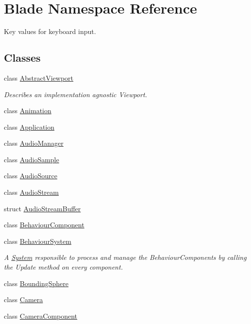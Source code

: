\hypertarget{namespace_blade}{}\section{Blade Namespace Reference}
\label{namespace_blade}


Key values for keyboard input.  


\subsection*{Classes}
\begin{DoxyCompactItemize}
\item 
class \hyperlink{class_blade_1_1_abstract_viewport}{Abstract\+Viewport}
\begin{DoxyCompactList}\small\item\em Describes an implementation agnostic Viewport. \end{DoxyCompactList}\item 
class \hyperlink{class_blade_1_1_animation}{Animation}
\item 
class \hyperlink{class_blade_1_1_application}{Application}
\item 
class \hyperlink{class_blade_1_1_audio_manager}{Audio\+Manager}
\item 
class \hyperlink{class_blade_1_1_audio_sample}{Audio\+Sample}
\item 
class \hyperlink{class_blade_1_1_audio_source}{Audio\+Source}
\item 
class \hyperlink{class_blade_1_1_audio_stream}{Audio\+Stream}
\item 
struct \hyperlink{struct_blade_1_1_audio_stream_buffer}{Audio\+Stream\+Buffer}
\item 
class \hyperlink{class_blade_1_1_behaviour_component}{Behaviour\+Component}
\item 
class \hyperlink{class_blade_1_1_behaviour_system}{Behaviour\+System}
\begin{DoxyCompactList}\small\item\em A \hyperlink{class_blade_1_1_system}{System} responsible to process and manage the Behaviour\+Components by calling the Update method on every component. \end{DoxyCompactList}\item 
class \hyperlink{class_blade_1_1_bounding_sphere}{Bounding\+Sphere}
\item 
class \hyperlink{class_blade_1_1_camera}{Camera}
\item 
class \hyperlink{class_blade_1_1_camera_component}{Camera\+Component}

\end{DoxyCompactItemize}
